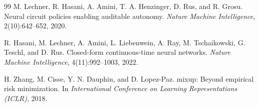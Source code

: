 \documentclass[11pt]{article}
\begin{document}
\begin{thebibliography}{99}
M. Lechner, R. Hasani, A. Amini, T. A. Henzinger, D. Rus, and R. Grosu. Neural circuit policies enabling auditable autonomy. \emph{Nature Machine Intelligence}, 2(10):642--652, 2020.

R. Hasani, M. Lechner, A. Amini, L. Liebenwein, A. Ray, M. Tschaikowski, G. Teschl, and D. Rus. Closed-form continuous-time neural networks. \emph{Nature Machine Intelligence}, 4(11):992--1003, 2022.

H. Zhang, M. Cisse, Y. N. Dauphin, and D. Lopez-Paz. mixup: Beyond empirical risk minimization. In \emph{International Conference on Learning Representations (ICLR)}, 2018.

\end{thebibliography}
\end{document}
